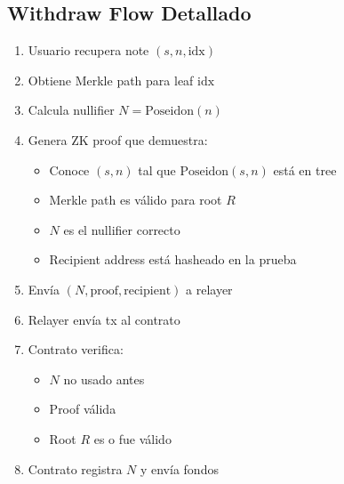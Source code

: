 \documentclass[11pt,a4paper,twoside]{book}
\begin{document}
\subsection{Withdraw Flow Detallado}

\begin{enumerate}
    \item Usuario recupera note $(s, n, \text{idx})$
    \item Obtiene Merkle path para leaf $\text{idx}$
    \item Calcula nullifier $N = \text{Poseidon}(n)$
    \item Genera ZK proof que demuestra:
    \begin{itemize}
        \item Conoce $(s, n)$ tal que $\text{Poseidon}(s, n)$ est\'a en tree
        \item Merkle path es v\'alido para root $R$
        \item $N$ es el nullifier correcto
        \item Recipient address est\'a hasheado en la prueba
    \end{itemize}
    \item Env\'ia $(N, \text{proof}, \text{recipient})$ a relayer
    \item Relayer env\'ia tx al contrato
    \item Contrato verifica:
    \begin{itemize}
        \item $N$ no usado antes
        \item Proof v\'alida
        \item Root $R$ es o fue v\'alido
    \end{itemize}
    \item Contrato registra $N$ y env\'ia fondos
\end{enumerate}
\end{document}
